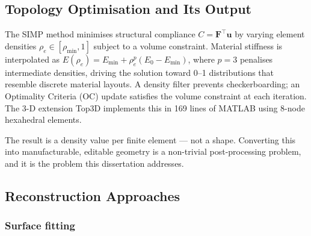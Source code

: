 \documentclass[11pt,a4paper]{article}
\begin{document}
\subsection{Topology Optimisation and Its Output}
\label{subsec:simp_background}


The SIMP method \cite{bendsoe1988,sigmund2001} minimises structural compliance
$C = \mathbf{F}^\top\mathbf{u}$ by varying element densities
$\rho_e \in [\rho_{\min}, 1]$ subject to a volume constraint.
Material stiffness is interpolated as
$E(\rho_e) = E_{\min} + \rho_e^p(E_0 - E_{\min})$,
where $p = 3$ penalises intermediate densities, driving the solution toward
0--1 distributions that resemble discrete material layouts.
A density filter prevents checkerboarding; an Optimality Criteria (OC)
update satisfies the volume constraint at each iteration.
The 3-D extension Top3D \cite{liu2014} implements this in 169 lines of MATLAB
using 8-node hexahedral elements.

The result is a density value per finite element --- not a shape.
Converting this into manufacturable, editable geometry is a non-trivial
post-processing problem, and it is the problem this dissertation addresses.

\subsection{Reconstruction Approaches}
\label{subsec:reconstruction_survey}


\subsubsection{Surface fitting}
\end{document}
